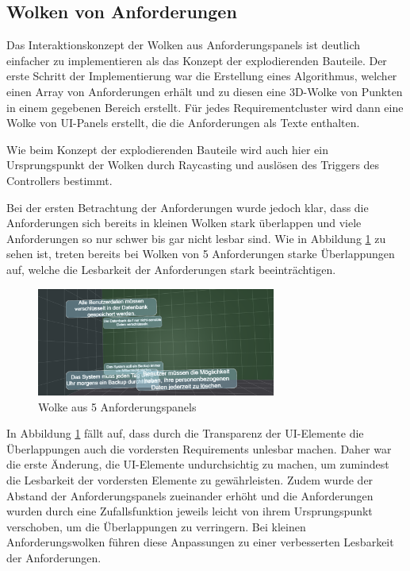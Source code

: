 \subsection{Wolken von Anforderungen}

Das Interaktionskonzept der Wolken aus Anforderungspanels ist deutlich einfacher zu implementieren als das Konzept der explodierenden Bauteile.
Der erste Schritt der Implementierung war die Erstellung eines Algorithmus, welcher einen Array von Anforderungen erhält und zu diesen eine 3D-Wolke von Punkten in einem gegebenen Bereich erstellt.
Für jedes Requirementcluster wird dann eine Wolke von UI-Panels erstellt, die die Anforderungen als Texte enthalten.

Wie beim Konzept der explodierenden Bauteile wird auch hier ein Ursprungspunkt der Wolken durch Raycasting und auslösen des Triggers des Controllers bestimmt.

Bei der ersten Betrachtung der Anforderungen wurde jedoch klar, dass die Anforderungen sich bereits in kleinen Wolken stark überlappen und viele Anforderungen so nur schwer bis gar nicht lesbar sind.
Wie in Abbildung \ref{fig:wolken-prototyp} zu sehen ist, treten bereits bei Wolken von 5 Anforderungen  starke Überlappungen auf, welche die Lesbarkeit der Anforderungen stark beeinträchtigen.

\begin{figure}[H]
    \centering
    \includegraphics[width=0.7\textwidth]{images/WolkenPrototyp.png}
    \caption{Wolke aus 5 Anforderungspanels}
    \label{fig:wolken-prototyp}
\end{figure}

In Abbildung \ref{fig:wolken-prototyp} fällt auf, dass durch die Transparenz der UI-Elemente die Überlappungen auch die vordersten Requirements unlesbar machen.
Daher war die erste Änderung, die UI-Elemente undurchsichtig zu machen, um zumindest die Lesbarkeit der vordersten Elemente zu gewährleisten.
Zudem wurde der Abstand der Anforderungspanels zueinander erhöht und die Anforderungen wurden durch eine Zufallsfunktion jeweils leicht von ihrem Ursprungspunkt verschoben, um die Überlappungen zu verringern.
Bei kleinen Anforderungswolken führen diese Anpassungen zu einer verbesserten Lesbarkeit der Anforderungen.

